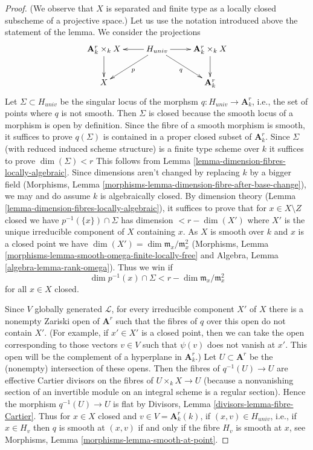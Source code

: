 \documentclass[10pt,a4paper]{amsart}
\theoremstyle{plain}
\theoremstyle{definition}
\theoremstyle{remark}
\numberwithin{equation}{subsection}
\begin{document}
\begin{proof}
(We observe that $X$ is separated and finite type as a locally
closed subscheme of a projective space.)
Let us use the notation introduced above the statement of the lemma.
We consider the projections
$$
\xymatrix{
\mathbf{A}^r_k \times_k X \ar[d] &
H_{univ} \ar[l] \ar[ld]^p \ar[r] \ar[rd]_q &
\mathbf{A}^r_k \times_k X \ar[d] \\
X & &
\mathbf{A}^r_k
}
$$
Let $\Sigma \subset H_{univ}$ be the singular locus of the morphsm
$q : H_{univ} \to \mathbf{A}^r_k$, i.e., the set of points where
$q$ is not smooth. Then $\Sigma$ is closed because the smooth locus
of a morphism is open by definition. Since the fibre of a
smooth morphism is smooth, it suffices to prove $q(\Sigma)$
is contained in a proper closed subset of $\mathbf{A}^r_k$.
Since $\Sigma$ (with reduced induced scheme structure) is a
finite type scheme over $k$ it suffices to prove $\dim(\Sigma) < r$
This follows from Lemma \ref{lemma-dimension-fibres-locally-algebraic}.
Since dimensions aren't changed by replacing $k$ by a bigger field
(Morphisms, Lemma \ref{morphisms-lemma-dimension-fibre-after-base-change}),
we may and do assume $k$ is algebraically closed.
By dimension theory (Lemma \ref{lemma-dimension-fibres-locally-algebraic}),
it suffices to prove that for $x \in X \setminus Z$ closed we have
$p^{-1}(\{x\}) \cap \Sigma$ has dimension $< r - \dim(X')$
where $X'$ is the unique irreducible component of $X$ containing $x$.
As $X$ is smooth over $k$ and $x$ is a closed point we have
$\dim(X') = \dim \mathfrak m_x/\mathfrak m_x^2$
(Morphisms, Lemma \ref{morphisms-lemma-smooth-omega-finite-locally-free}
and Algebra, Lemma \ref{algebra-lemma-rank-omega}).
Thus we win if
$$
\dim p^{-1}(x) \cap \Sigma < r - \dim \mathfrak m_x/\mathfrak m_x^2
$$
for all $x \in X$ closed.

\medskip\noindent
Since $V$ globally generated $\mathcal{L}$, for every irreducible component
$X'$ of $X$ there is a nonempty Zariski open of $\mathbf{A}^r$ such that the
fibres of $q$ over this open do not contain $X'$. (For example, if $x' \in X'$
is a closed point, then we can take the open corresponding to those
vectors $v \in V$ such that $\psi(v)$ does not vanish at $x'$. This
open will be the complement of a hyperplane in $\mathbf{A}^r_k$.)
Let $U \subset \mathbf{A}^r$ be the (nonempty) intersection of these opens.
Then the fibres of $q^{-1}(U) \to U$ are effective Cartier divisors
on the fibres of $U \times_k X \to U$ (because a nonvanishing section
of an invertible module on an integral scheme is a regular section). Hence the
morphism $q^{-1}(U) \to U$ is flat by
Divisors, Lemma \ref{divisors-lemma-fibre-Cartier}.
Thus for $x \in X$ closed and $v \in V = \mathbf{A}^r_k(k)$,
if $(x, v) \in H_{univ}$, i.e., if $x \in H_v$
then $q$ is smooth at $(x, v)$ if and only if the fibre
$H_v$ is smooth at $x$, see
Morphisms, Lemma \ref{morphisms-lemma-smooth-at-point}.


\end{proof}
\end{document}
